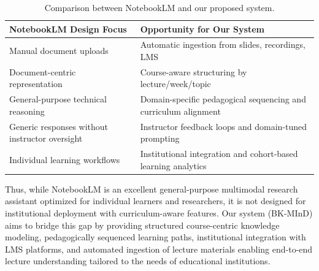 \begin{table}[H]
\centering
\caption[NotebookLM Comparison]{Comparison between NotebookLM and our proposed system.}
\label{tab:comparison-notebooklm}
\begin{tabular*}{\textwidth}{@{\extracolsep{\fill}}p{}p{}@{}}
\toprule
\textbf{NotebookLM Design Focus} & \textbf{Opportunity for Our System} \\ \midrule
Manual document uploads & Automatic ingestion from slides, recordings, LMS \\
Document-centric representation & Course-aware structuring by lecture/week/topic \\
General-purpose technical reasoning & Domain-specific pedagogical sequencing and curriculum alignment \\
Generic responses without instructor oversight & Instructor feedback loops and domain-tuned prompting \\
Individual learning workflows & Institutional integration and cohort-based learning analytics \\ \bottomrule
\end{tabular*}
\end{table}

Thus, while NotebookLM is an excellent general-purpose multimodal research assistant optimized for individual learners and researchers, it is not designed for institutional deployment with curriculum-aware features. Our system (BK-MInD) aims to bridge this gap by providing structured course-centric knowledge modeling, pedagogically sequenced learning paths, institutional integration with LMS platforms, and automated ingestion of lecture materials enabling end-to-end lecture understanding tailored to the needs of educational institutions.



\newpage
